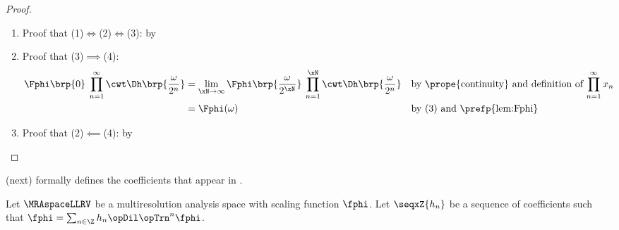 \begin{proof}
  \begin{enumerate}
    \item Proof that (1)$\iff$(2)$\iff$(3): by 
    \item Proof that (3)$\implies$(4):
      \begin{align*}
        \Fphi\brp{0}\:\prod_{n=1}^{\infty} \cwt \Dh\brp{\frac{\omega}{2^n}}
          &= \lim_{\xN\to\infty}\Fphi\brp{\frac{\omega}{2^{\xN}}}\:\prod_{n=1}^{\xN} \cwt \Dh\brp{\frac{\omega}{2^n}}
          && \text{by \prope{continuity} and definition of $\prod_{n=1}^\infty x_n$}
        \\&= \Fphi(\omega)
          && \text{by (3) and \prefp{lem:Fphi}}
      \end{align*}
    \item Proof that (2)$\impliedby$(4): by 
  \end{enumerate}
\end{proof}





 (next) formally defines the coefficients that appear in .
\begin{definition}%
\label{def:hn}
\label{def:mrasys}
Let $\MRAspaceLLRV$ be a multiresolution analysis space with scaling function $\fphi$.
Let $\seqxZ{h_n}$ be a sequence of coefficients such that $\fphi = \sum_{n\in\Z}  h_n \opDil\opTrn^n \fphi$.
\end{definition}

